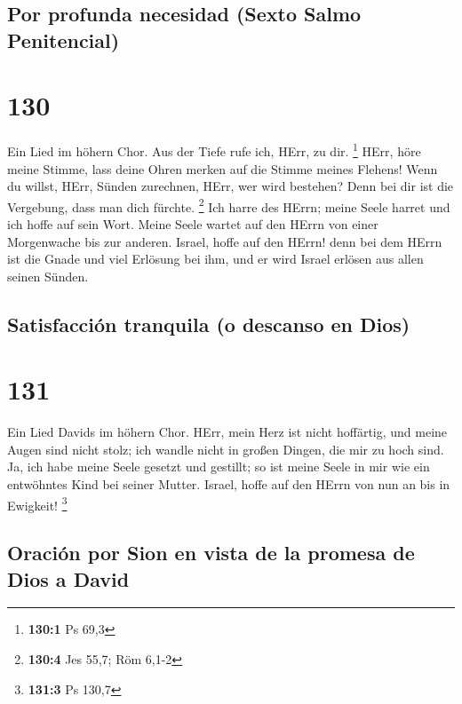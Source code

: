 \hypertarget{por-profunda-necesidad-sexto-salmo-penitencial}{%
\subsection{Por profunda necesidad (Sexto Salmo
Penitencial)}\label{por-profunda-necesidad-sexto-salmo-penitencial}}

\hypertarget{section-129}{%
\section{130}\label{section-129}}

 Ein Lied im höhern Chor. Aus der Tiefe rufe ich, HErr, zu
dir. \footnote{\textbf{130:1} Ps 69,3}  HErr, höre meine
Stimme, lass deine Ohren merken auf die Stimme meines Flehens!
 Wenn du willst, HErr, Sünden zurechnen, HErr, wer wird
bestehen?  Denn bei dir ist die Vergebung, dass man dich
fürchte. \footnote{\textbf{130:4} Jes 55,7; Röm 6,1-2} 
Ich harre des HErrn; meine Seele harret und ich hoffe auf sein Wort.
 Meine Seele wartet auf den HErrn von einer Morgenwache
bis zur anderen.  Israel, hoffe auf den HErrn! denn bei
dem HErrn ist die Gnade und viel Erlösung bei ihm,  und er
wird Israel erlösen aus allen seinen Sünden.

\hypertarget{satisfacciuxf3n-tranquila-o-descanso-en-dios}{%
\subsection{Satisfacción tranquila (o descanso en
Dios)}\label{satisfacciuxf3n-tranquila-o-descanso-en-dios}}

\hypertarget{section-130}{%
\section{131}\label{section-130}}

 Ein Lied Davids im höhern Chor. HErr, mein Herz ist nicht
hoffärtig, und meine Augen sind nicht stolz; ich wandle nicht in großen
Dingen, die mir zu hoch sind.  Ja, ich habe meine Seele
gesetzt und gestillt; so ist meine Seele in mir wie ein entwöhntes Kind
bei seiner Mutter.  Israel, hoffe auf den HErrn von nun an
bis in Ewigkeit! \footnote{\textbf{131:3} Ps 130,7}

\hypertarget{oraciuxf3n-por-sion-en-vista-de-la-promesa-de-dios-a-david}{%
\subsection{Oración por Sion en vista de la promesa de Dios a
David}\label{oraciuxf3n-por-sion-en-vista-de-la-promesa-de-dios-a-david}}

